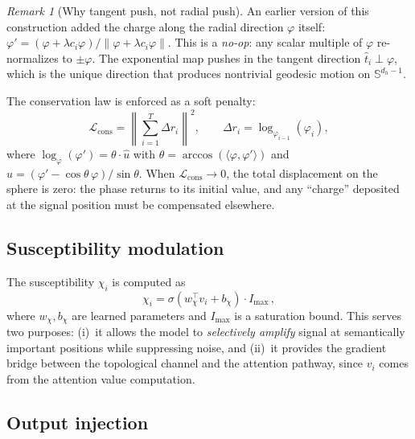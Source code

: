 \documentclass[11pt,a4paper]{article}
\theoremstyle{definition}
\theoremstyle{remark}
\newtheorem{remark}[theorem]{Remark}
\newcommand{\Sphere}{\mathbb{S}}
\begin{document}
\begin{remark}[Why tangent push, not radial push]
\label{rem:tangent_push}
An earlier version of this construction added the charge 
along the radial direction $\varphi$ itself: 
$\varphi' = (\varphi + \lambda c_i \varphi) / 
\|\varphi + \lambda c_i \varphi\|$. This is a \emph{no-op}: 
any scalar multiple of $\varphi$ re-normalizes to 
$\pm\varphi$. The exponential map pushes in the tangent 
direction $\hat{t}_i \perp \varphi$, which is the unique 
direction that produces nontrivial geodesic motion on 
$\Sphere^{d_h - 1}$.
\end{remark}

The conservation law is enforced as a soft penalty:
\begin{equation}\label{eq:topo_conservation}
  \mathcal{L}_{\mathrm{cons}} = 
  \left\|\sum_{i=1}^{T} \Delta r_i\right\|^2, \qquad
  \Delta r_i = \log_{\varphi_{i-1}}(\varphi_i),
\end{equation}
where $\log_\varphi(\varphi') = \theta \cdot \hat{u}$ with 
$\theta = \arccos(\langle \varphi, \varphi' \rangle)$ and 
$\hat{u} = (\varphi' - \cos\theta\,\varphi)/\sin\theta$. When 
$\mathcal{L}_{\mathrm{cons}} \to 0$, the total displacement on 
the sphere is zero: the phase returns to its initial value, and 
any ``charge'' deposited at the signal position must be 
compensated elsewhere.

\subsection{Susceptibility modulation}%
\label{sec:topo_susceptibility}

The susceptibility $\chi_i$ is computed as
\begin{equation}\label{eq:susceptibility}
  \chi_i = \sigma\!\left(w_\chi^\top v_i + b_\chi\right) 
  \cdot I_{\max}\,,
\end{equation}
where $w_\chi, b_\chi$ are learned parameters and $I_{\max}$ 
is a saturation bound. This serves two purposes: (i)~it allows 
the model to \emph{selectively amplify} signal at semantically 
important positions while suppressing noise, and (ii)~it 
provides the gradient bridge between the topological channel 
and the attention pathway, since $v_i$ comes from the attention 
value computation.

\subsection{Output injection}%
\label{sec:topo_output}
\end{document}
